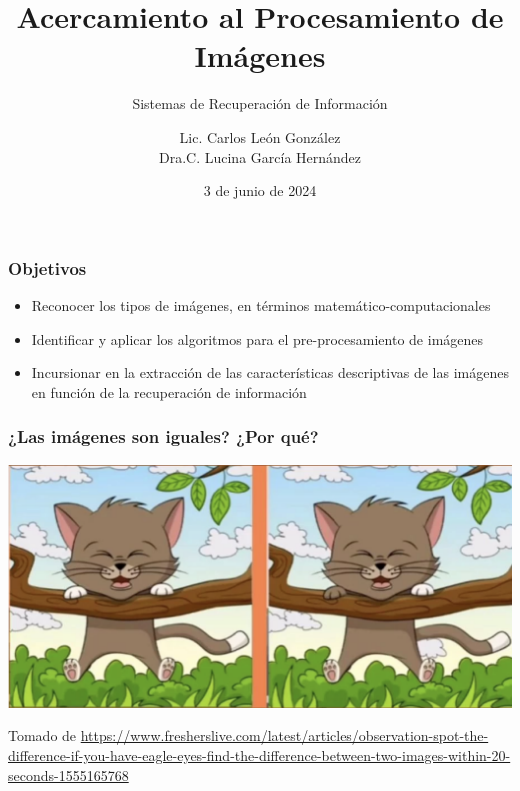 \documentclass[
10pt, %
aspectratio=169, %
]{beamer}
\title[Short Title]{Acercamiento al Procesamiento de Imágenes}
\subtitle{Sistemas de Recuperación de Información}
\author{Lic. Carlos León González \\ Dra.C. Lucina García Hernández}
\institute[UC]{Facultad de Matem\'atica y Computaci\'on \\ Universidad de La Habana \\ \smallskip }
\date{3 de junio de  2024} %
\begin{document}
	
	
	
	\begin{frame}
		\titlepage
	\end{frame}
	
	
	\begin{frame}
		
		\frametitle{Objetivos}
		
		\begin{itemize}
			\item Reconocer los tipos de imágenes, en términos matemático-computacionales
			
			\item Identificar y aplicar los algoritmos para el pre-procesamiento de imágenes
			
			\item Incursionar en la extracción de las características descriptivas de las imágenes en función de la recuperación de información
		\end{itemize}
				
	\end{frame}
		
	\begin{frame}
		
		\frametitle{¿Las imágenes son iguales? ¿Por qué?}
		
		\vspace{1\baselineskip}
		
		\centering
		\includegraphics[scale=0.5]{gato.png} 
		
		{\scriptsize Tomado de \url{https://www.fresherslive.com/latest/articles/observation-spot-the-difference-if-you-have-eagle-eyes-find-the-difference-between-two-images-within-20-seconds-1555165768}}
		
	\end{frame}
	
\end{document}
